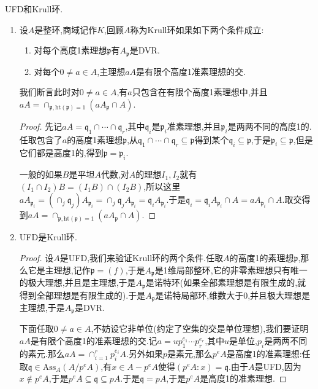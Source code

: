 UFD和Krull环.
\begin{enumerate}
	\item 设$A$是整环,商域记作$K$,回顾$A$称为Krull环如果如下两个条件成立:
	\begin{enumerate}
		\item 对每个高度1素理想$\mathfrak{p}$有$A_{\mathfrak{p}}$是DVR.
		\item 对每个$0\not=a\in A$,主理想$aA$是有限个高度1准素理想的交.
	\end{enumerate}
    
    我们断言此时对$0\not=a\in A$,有$a$只包含在有限个高度1素理想中,并且$aA=\cap_{\mathfrak{p},\mathrm{ht}(\mathfrak{p})=1}(aA_{\mathfrak{p}}\cap A)$.
    \begin{proof}
    	
    	先记$aA=\mathfrak{q}_1\cap\cdots\cap\mathfrak{q}_r$,其中$\mathfrak{q}_i$是$\mathfrak{p}_i$准素理想,并且$\mathfrak{p}_i$是两两不同的高度1的.任取包含了$a$的高度1素理想$\mathfrak{p}$,从$\mathfrak{q}_1\cap\cdots\cap\mathfrak{q}_r\subseteq\mathfrak{p}$得到某个$\mathfrak{q}_i\subseteq\mathfrak{p}$,于是$\mathfrak{p}_i\subseteq\mathfrak{p}$,但是它们都是高度1的,得到$\mathfrak{p}=\mathfrak{p}_i$.
    	
    	\qquad
    	
    	一般的如果$B$是平坦$A$代数,对$A$的理想$I_1,I_2$就有$(I_1\cap I_2)B=(I_1B)\cap(I_2B)$,所以这里$aA_{\mathfrak{p}_i}=\left(\cap_j\mathfrak{q}_j\right)A_{\mathfrak{p}_i}=\cap_j\mathfrak{q}_jA_{\mathfrak{p}_i}=\mathfrak{q}_iA_{\mathfrak{p}_i}$.于是$\mathfrak{q}_i=\mathfrak{q}_iA_{\mathfrak{p}_i}\cap A=aA_{\mathfrak{p}_i}\cap A$.取交得到$aA=\cap_{\mathfrak{p},\mathrm{ht}(\mathfrak{p})=1}(aA_{\mathfrak{p}}\cap A)$.
    \end{proof}
    \item UFD是Krull环.
    \begin{proof}
    	
    	设$A$是UFD,我们来验证Krull环的两个条件.任取$A$的高度1的素理想$\mathfrak{p}$,那么它是主理想,记作$\mathfrak{p}=(f)$,于是$A_{\mathfrak{p}}$是1维局部整环,它的非零素理想只有唯一的极大理想,并且是主理想,于是$A_{\mathfrak{p}}$是诺特环(如果全部素理想是有限生成的,就得到全部理想是有限生成的).于是$A_{\mathfrak{p}}$是诺特局部环,维数大于0,并且极大理想是主理想,于是$A_{\mathfrak{p}}$是DVR.
    	
    	\qquad
    	
    	下面任取$0\not=a\in A$,不妨设它非单位(约定了空集的交是单位理想),我们要证明$aA$是有限个高度1的准素理想的交.记$a=up_1^{e_1}\cdots p_r^{e_r}$,其中$u$是单位,$p_i$是两两不同的素元.那么$aA=\cap_{i=1}^rp_i^{e_i}A$.另外如果$p$是素元,那么$p^eA$是高度1的准素理想:任取$\mathfrak{q}\in\mathrm{Ass}_A(A/p^eA)$,有$x\in A-p^eA$使得$(p^eA:x)=\mathfrak{q}$.由于$A$是UFD,因为$x\not\in p^eA$,于是$p^eA\subseteq\mathfrak{q}\subseteq pA$.于是$\mathfrak{q}=pA$,于是$p^eA$是高度1的准素理想.
    \end{proof}
\end{enumerate}

